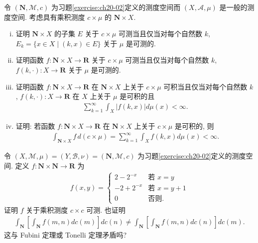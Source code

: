 \documentclass[../../main.tex]{subfiles}
\begin{document}
\begin{exercise}\label{exercise:ch20-04}
令 $(\mathbf{N},\mathcal{M},c)$ 为习题\cref{exercise:ch20-02}定义的测度空间而 $(X,\mathcal{A},\mu)$ 是一般的测度空间. 考虑具有乘积测度 $c\times\mu$ 的 $\mathbf{N}\times X$.
\begin{enumerate}[(i)]
\item 证明 $\mathbf{N}\times X$ 的子集 $E$ 关于 $c\times\mu$ 可测当且仅当对每个自然数 $k$, $E_{k}=\{x\in X\mid(k,x)\in E\}$ 关于 $\mu$ 是可测的.
\item 证明函数 $f:\mathbf{N}\times X\to\mathbf{R}$ 关于 $c\times\mu$ 可测当且仅当对每个自然数 $k$, $f(k,\cdot):X\to\mathbf{R}$ 关于 $\mu$ 是可测的.
\item 证明函数 $f:\mathbf{N}\times X\to\mathbf{R}$ 在 $\mathbf{N}\times X$ 上关于 $c\times\mu$ 可积当且仅当对每个自然数 $k$, $f(k,\cdot):X\to\mathbf{R}$ 在 $X$ 上关于 $\mu$ 是可积的且
\begin{align*}
\sum_{k=1}^{\infty}\int_{X}|f(k,x)|d\mu(x)<\infty.
\end{align*}
\item 证明: 若函数 $f:\mathbf{N}\times X\to\mathbf{R}$ 在 $\mathbf{N}\times X$ 上关于 $c\times\mu$ 是可积的, 则
\begin{align*}
\int_{\mathbf{N}\times X}f\,d(c\times\mu)=\sum_{k=1}^{\infty}\int_{X}f(k,x)d\mu(x)<\infty.
\end{align*}
\end{enumerate}
\end{exercise}

\begin{exercise}\label{exercise:ch20-05}
令 $(X,\mathcal{M},\mu)=(Y,\mathcal{B},\nu)=(\mathbf{N},\mathcal{M},c)$ 为习题\cref{exercise:ch20-02}定义的测度空间. 定义 $f:\mathbf{N}\times\mathbf{N}\to\mathbf{R}$ 为
\begin{align*}
f(x,y)=\begin{cases}2-2^{-x}&\text{若 }x=y\\-2+2^{-x}&\text{若 }x=y+1\\0&\text{否则.}\end{cases}
\end{align*}
证明 $f$ 关于乘积测度 $c\times c$ 可测. 也证明
\begin{align*}
\int_{\mathbf{N}}\left[\int_{\mathbf{N}}f(m,n)dc(m)\right]dc(n)\neq\int_{\mathbf{N}}\left[\int_{\mathbf{N}}f(m,n)dc(n)\right]dc(m).
\end{align*}
这与 Fubini 定理或 Tonelli 定理矛盾吗?
\end{exercise}
\end{document}
